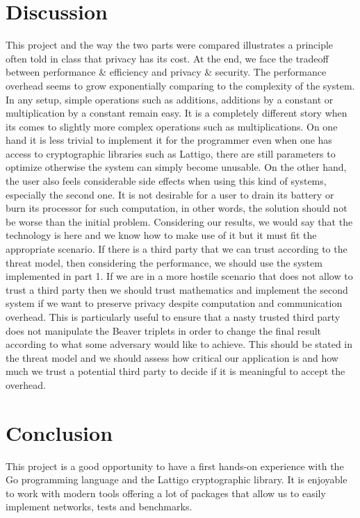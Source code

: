 \documentclass[10pt,conference]{IEEEtran}
\begin{document}
\begin{itemize}
\section{Discussion}
This project and the way the two parts were compared illustrates a principle often told in class that privacy has its cost. At the end, we face the tradeoff between performance & efficiency and privacy & security. The performance overhead seems to grow exponentially comparing to the complexity of the system. In any setup, simple operations such as additions, additions by a constant or multiplication by a constant remain easy. It is a completely different story when its comes to slightly more complex operations such as multiplications. On one hand it is less trivial to implement it for the programmer even when one has access to cryptographic libraries such as Lattigo, there are still parameters to optimize otherwise the system can simply become unusable. On the other hand, the user also feels considerable side effects when using this kind of systems, especially the second one. It is not desirable for a user to drain its battery or burn its processor for such computation, in other words, the solution should not be worse than the initial problem. Considering our results, we would say that the technology is here and we know how to make use of it but it must fit the appropriate scenario. If there is a third party that we can trust according to the threat model, then considering the performance, we should use the system implemented in part 1. If we are in a more hostile scenario that does not allow to trust a third party then we should trust mathematics and implement the second system if we want to preserve privacy despite computation and communication overhead. This is particularly useful to ensure that a nasty trusted third party does not manipulate the Beaver triplets in order to change the final result according to what some adversary would like to achieve. This should be stated in the threat model and we should assess how critical our application is and how much we trust a potential third party to decide if it is meaningful to accept the overhead.

\section{Conclusion}
This project is a good opportunity to have a first hands-on experience with the Go programming language and the Lattigo cryptographic library. It is enjoyable to work with modern tools offering a lot of packages that allow us to easily implement networks, tests and benchmarks.


\end{itemize}
\end{document}
